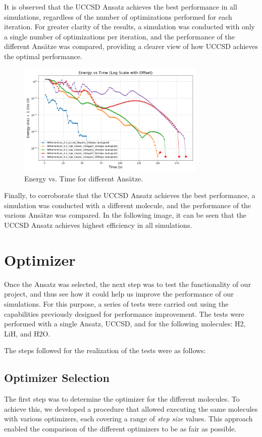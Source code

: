 It is observed that the UCCSD Ansatz achieves the best performance in all simulations, regardless of the number of optimizations performed for each iteration. For greater clarity of the results, a simulation was conducted with only a single number of optimizations per iteration, and the performance of the different Ansätze was compared, providing a clearer view of how UCCSD achieves the optimal performance.

\begin{figure}[H]
  \centering
  \includegraphics[width=0.8\textwidth]{data/Anzatz/results_ansatz_lyers/energy_vs_time_log_offset.png}
  \caption{Energy vs. Time for different Ansätze.}
  \label{fig:ansatz_layers}
\end{figure}

Finally, to corroborate that the UCCSD Ansatz achieves the best performance, a simulation was conducted with a different molecule, and the performance of the various Ansätze was compared. In the following image, it can be seen that the UCCSD Ansatz achieves highest efficiency in all simulations.

\section{Optimizer}

Once the Ansatz was selected, the next step was to test the functionality of our project, and thus see how it could help us improve the performance of our simulations. For this purpose, a series of tests were carried out using the capabilities previously designed for performance improvement. The tests were performed with a single Ansatz, UCCSD, and for the following molecules: H2, LiH, and H2O.

The steps followed for the realization of the tests were as follows:
\subsection{Optimizer Selection}
The first step was to determine the optimizer for the different molecules. To achieve this, we developed a procedure that allowed executing the same molecules with various optimizers, each covering a range of \emph{step size} values. This approach enabled the comparison of the different optimizers to be as fair as possible.

